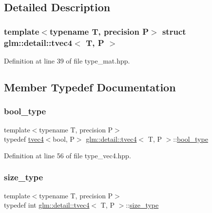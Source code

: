 \subsection{Detailed Description}
\subsubsection*{template$<$typename T, precision P$>$\newline
struct glm\+::detail\+::tvec4$<$ T, P $>$}



Definition at line 39 of file type\+\_\+mat.\+hpp.



\subsection{Member Typedef Documentation}
\mbox{\label{structglm_1_1detail_1_1tvec4_ae066d27ec9adb11c25f37abe9b3a4161}} 
\subsubsection{\texorpdfstring{bool\+\_\+type}{bool\_type}}
{\footnotesize\ttfamily template$<$typename T, precision P$>$ \\
typedef \hyperlink{structglm_1_1detail_1_1tvec4}{tvec4}$<$bool, P$>$ \hyperlink{structglm_1_1detail_1_1tvec4}{glm\+::detail\+::tvec4}$<$ T, P $>$\+::\hyperlink{structglm_1_1detail_1_1tvec4_ae066d27ec9adb11c25f37abe9b3a4161}{bool\+\_\+type}}



Definition at line 56 of file type\+\_\+vec4.\+hpp.

\mbox{\label{structglm_1_1detail_1_1tvec4_a92061c78c7801c2cedb6c1bae68d1fd4}} 
\subsubsection{\texorpdfstring{size\+\_\+type}{size\_type}}
{\footnotesize\ttfamily template$<$typename T, precision P$>$ \\
typedef int \hyperlink{structglm_1_1detail_1_1tvec4}{glm\+::detail\+::tvec4}$<$ T, P $>$\+::\hyperlink{structglm_1_1detail_1_1tvec4_a92061c78c7801c2cedb6c1bae68d1fd4}{size\+\_\+type}}



